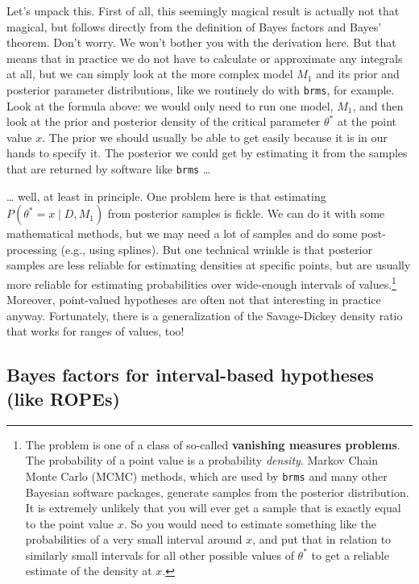 \documentclass[
  doc,
  floatsintext,
  longtable,
  nolmodern,
  notxfonts,
  notimes,
  colorlinks=true,linkcolor=blue,citecolor=blue,urlcolor=blue]{apa7}
\begin{document}
Let's unpack this. First of all, this seemingly magical result is
actually not that magical, but follows directly from the definition of
Bayes factors and Bayes' theorem. Don't worry. We won't bother you with
the derivation here. But that means that in practice we do not have to
calculate or approximate any integrals at all, but we can simply look at
the more complex model \(M_1\) and its prior and posterior parameter
distributions, like we routinely do with \texttt{brms}, for example.
Look at the formula above: we would only need to run one model, \(M_1\),
and then look at the prior and posterior density of the critical
parameter \(\theta^*\) at the point value \(x\). The prior we should
usually be able to get easily because it is in our hands to specify it.
The posterior we could get by estimating it from the samples that are
returned by software like \texttt{brms} \ldots{}

\ldots{} well, at least in principle. One problem here is that
estimating \(P(\theta^*=x \mid D, M_1)\) from posterior samples is
fickle. We can do it with some mathematical methods, but we may need a
lot of samples and do some post-processing (e.g., using splines). But
one technical wrinkle is that posterior samples are less reliable for
estimating densities at specific points, but are usually more reliable
for estimating probabilities over wide-enough intervals of
values.\footnote{The problem is one of a class of so-called
  \textbf{vanishing measures problems}. The probability of a point value
  is a probability \emph{density}. Markov Chain Monte Carlo (MCMC)
  methods, which are used by \texttt{brms} and many other Bayesian
  software packages, generate samples from the posterior distribution.
  It is extremely unlikely that you will ever get a sample that is
  exactly equal to the point value \(x\). So you would need to estimate
  something like the probabilities of a very small interval around
  \(x\), and put that in relation to similarly small intervals for all
  other possible values of \(\theta^*\) to get a reliable estimate of
  the density at \(x\).} Moreover, point-valued hypotheses are often not
that interesting in practice anyway. Fortunately, there is a
generalization of the Savage-Dickey density ratio that works for ranges
of values, too!

\subsection{Bayes factors for interval-based hypotheses (like
ROPEs)}\label{bayes-factors-for-interval-based-hypotheses-like-ropes}
\end{document}
